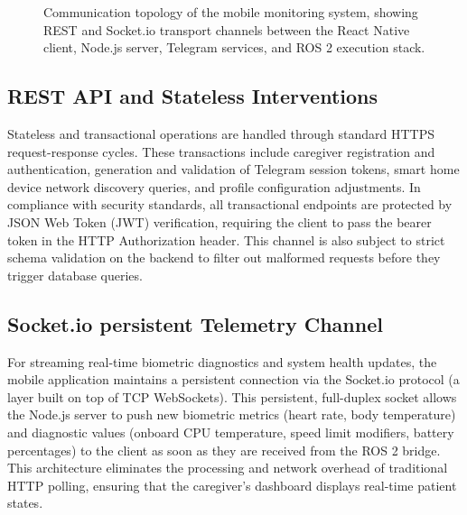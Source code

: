 \begin{figure}[H]
\caption{Communication topology of the mobile monitoring system, showing REST and Socket.io transport channels between the React Native client, Node.js server, Telegram services, and ROS 2 execution stack.}
\label{fig:mobile-server-comm-tikz}
\end{figure}

\subsection{REST API and Stateless Interventions}
Stateless and transactional operations are handled through standard HTTPS request-response cycles. These transactions include caregiver registration and authentication, generation and validation of Telegram session tokens, smart home device network discovery queries, and profile configuration adjustments. In compliance with security standards, all transactional endpoints are protected by JSON Web Token (JWT) verification, requiring the client to pass the bearer token in the HTTP Authorization header. This channel is also subject to strict schema validation on the backend to filter out malformed requests before they trigger database queries.

\subsection{Socket.io persistent Telemetry Channel}
For streaming real-time biometric diagnostics and system health updates, the mobile application maintains a persistent connection via the Socket.io protocol (a layer built on top of TCP WebSockets). This persistent, full-duplex socket allows the Node.js server to push new biometric metrics (heart rate, body temperature) and diagnostic values (onboard CPU temperature, speed limit modifiers, battery percentages) to the client as soon as they are received from the ROS 2 bridge. This architecture eliminates the processing and network overhead of traditional HTTP polling, ensuring that the caregiver's dashboard displays real-time patient states.

